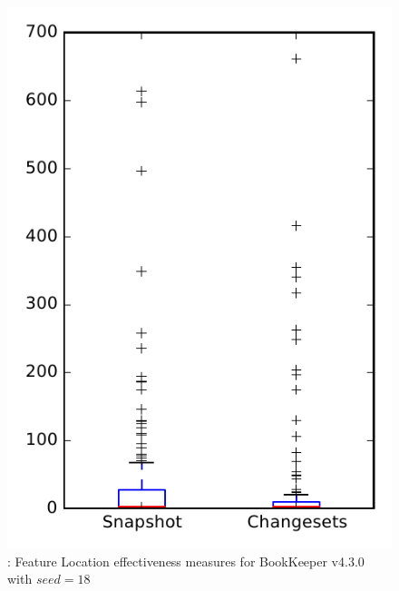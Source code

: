 
\begin{figure}
\centering
\includegraphics[height=0.4\textheight]{figures/flt_seed/rq1_bookkeeper_18}
\caption{\rone: Feature Location effectiveness measures for BookKeeper v4.3.0 with $seed=18$}
\label{fig:flt_seed:rq1:bookkeeper}
\end{figure}
